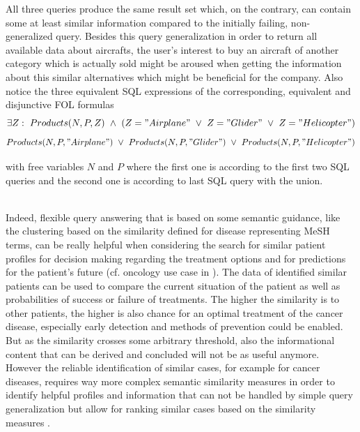 \begin{exmp}
All three queries produce the same result set which, on the contrary, can contain some at least similar information compared to the initially failing,
non-generalized query. Besides this query generalization in order to return all available data about aircrafts, the user's interest to buy an aircraft of
another category which is actually sold might be aroused when getting the information about this similar alternatives which might be beneficial for the
company. Also notice the three equivalent SQL expressions of the corresponding, equivalent and disjunctive FOL formulas
\begin{equation*}
\exists Z:~Products(N,P,Z)~\land~(Z="Airplane"~\lor~Z="Glider"~\lor~Z="Helicopter") \notag
\end{equation*}
\begin{equation}
    Products(N,P,"Airplane")~\lor~Products(N,P,"Glider")~\lor~Products(N,P,"Helicopter") \notag
\end{equation}   

with free variables $N$ and $P$ where the first one is according to the first two SQL queries and the second one is according to last SQL query with the 
union.
\end{exmp}

$ $\\
Indeed, flexible query answering that is based on some semantic guidance, like the clustering based on the similarity defined for disease representing 
MeSH terms, can be really helpful when considering the search for similar patient profiles for decision making regarding the treatment options and for 
predictions for the patient's future (cf. oncology use case in \cite{Haarbrandt2018}). The data of identified similar patients can be used to compare the
current situation of the patient as well as probabilities of success or failure of treatments. The higher the similarity is to other patients, the higher 
is also chance for an optimal treatment of the cancer disease, especially early detection and methods of prevention could be enabled. But as the 
similarity crosses some arbitrary threshold, also the informational content that can be derived and concluded will not be as useful anymore.
However the reliable identification of similar cases, for example for cancer diseases, requires way more complex semantic similarity measures in order 
to identify helpful profiles and information that can not be handled by simple query generalization but allow for ranking similar cases based on the
similarity measures \citep{Haarbrandt2018}.


